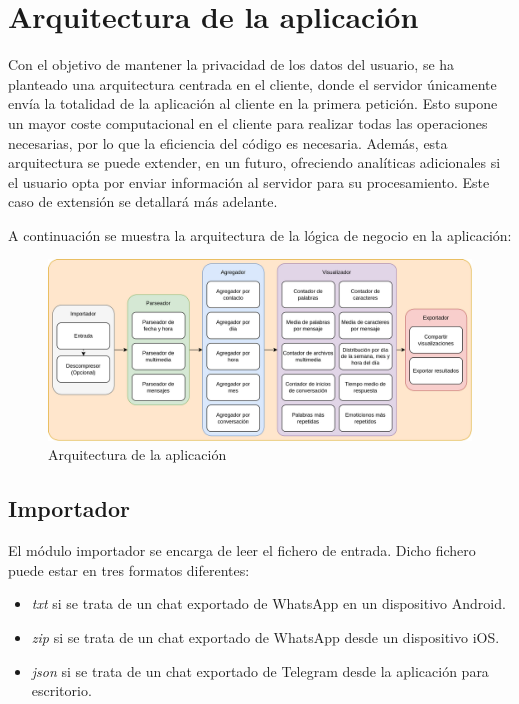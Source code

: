 \section{Arquitectura de la aplicación}
\label{chap:architecture:processing}


Con el objetivo de mantener la privacidad de los datos del usuario, se ha planteado una arquitectura centrada en el cliente, donde el servidor únicamente envía la totalidad de la aplicación al cliente en la primera petición. Esto supone un mayor coste computacional en el cliente para realizar todas las operaciones necesarias, por lo que la eficiencia del código es necesaria. Además, esta arquitectura se puede extender, en un futuro, ofreciendo analíticas adicionales si el usuario opta por enviar información al servidor para su procesamiento. Este caso de extensión se detallará más adelante.

A continuación se muestra la arquitectura de la lógica de negocio en la aplicación:

\begin{figure}[H]
	\centering
	\includegraphics[width=\textwidth]{img/architecture_processing.png}
	\caption{Arquitectura de la aplicación}
	\label{fig:chap4:architecture_processing}
\end{figure}

\subsection{Importador}

El módulo importador se encarga de leer el fichero de entrada. Dicho fichero puede estar en tres formatos diferentes:

\begin{itemize}
	\item \textit{txt} si se trata de un chat exportado de WhatsApp en un dispositivo Android.
	\item \textit{zip} si se trata de un chat exportado de WhatsApp desde un dispositivo iOS.
	\item \textit{\acrshort{json}} si se trata de un chat exportado de Telegram desde la aplicación para escritorio.
\end{itemize}

